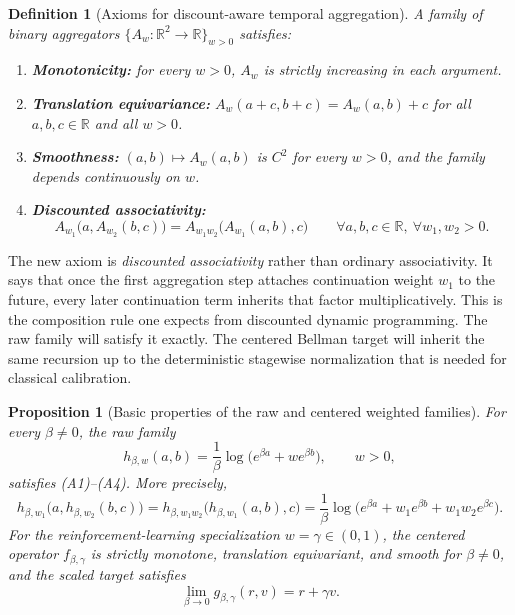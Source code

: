 \documentclass{article}
\newtheorem{proposition}[proposition]{Proposition}
\newtheorem{definition}[definition]{Definition}
\theoremstyle{remark}
\newcommand{\R}{\mathbb{R}}
\begin{document}
\begin{definition}[Axioms for discount-aware temporal aggregation]
\label{def:axioms}
A family of binary aggregators $\{A_w:\R^2\to\R\}_{w>0}$ satisfies:
\begin{enumerate}[label=(A\arabic*),leftmargin=1.5em]
    \item \textbf{Monotonicity:} for every $w>0$, $A_w$ is strictly increasing in each argument.
    \item \textbf{Translation equivariance:} $A_w(a+c,b+c)=A_w(a,b)+c$ for all $a,b,c\in\R$ and all $w>0$.
    \item \textbf{Smoothness:} $(a,b)\mapsto A_w(a,b)$ is $C^2$ for every $w>0$, and the family depends continuously on $w$.
    \item \textbf{Discounted associativity:}
    \begin{equation}
    A_{w_1}\bigl(a,A_{w_2}(b,c)\bigr)
    =
    A_{w_1w_2}\bigl(A_{w_1}(a,b),c\bigr)
    \qquad \forall a,b,c\in\R,\ \forall w_1,w_2>0.
    \label{eq:discounted-assoc-axiom}
    \end{equation}
\end{enumerate}
\end{definition}

The new axiom is \emph{discounted associativity} rather than ordinary associativity.
It says that once the first aggregation step attaches continuation weight $w_1$ to the future, every later continuation term inherits that factor multiplicatively.
This is the composition rule one expects from discounted dynamic programming.
The raw family will satisfy it exactly.
The centered Bellman target will inherit the same recursion up to the deterministic stagewise normalization that is needed for classical calibration.

\begin{proposition}[Basic properties of the raw and centered weighted families]
\label{prop:weighted-basic}
For every $\beta\neq 0$, the raw family
\[
 h_{\beta,w}(a,b)=\frac{1}{\beta}\log\!\bigl(e^{\beta a}+w e^{\beta b}\bigr),
 \qquad w>0,
\]
satisfies \textnormal{(A1)--(A4)}.
More precisely,
\begin{equation}
 h_{\beta,w_1}\bigl(a,h_{\beta,w_2}(b,c)\bigr)
 =
 h_{\beta,w_1w_2}\bigl(h_{\beta,w_1}(a,b),c\bigr)
 =
 \frac{1}{\beta}\log\!\bigl(e^{\beta a}+w_1 e^{\beta b}+w_1w_2 e^{\beta c}\bigr).
\label{eq:discounted-assoc-weighted-lse}
\end{equation}
For the reinforcement-learning specialization $w=\gamma\in(0,1)$, the centered operator $f_{\beta,\gamma}$ is strictly monotone, translation equivariant, and smooth for $\beta\neq 0$, and the scaled target satisfies
\[
\lim_{\beta\to 0} g_{\beta,\gamma}(r,v)=r+\gamma v.
\]
\end{proposition}
\end{document}
